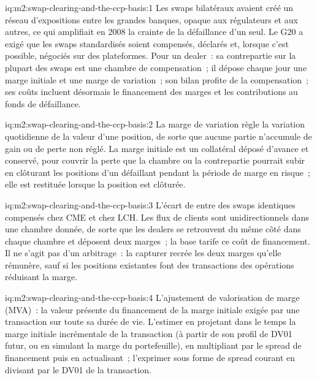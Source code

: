 \begin{solution}{iq:m2:swap-clearing-and-the-ccp-basis:1}
Les swaps bilatéraux avaient créé un réseau d'expositions entre les grandes banques, opaque aux
régulateurs et aux autres, ce qui amplifiait en 2008 la crainte de la défaillance d'un seul.
Le G20 a exigé que les swaps standardisés soient compensés, déclarés et, lorsque
c'est possible, négociés sur des plateformes. Pour un dealer~: sa contrepartie sur la plupart des swaps
est une chambre de compensation~; il dépose chaque jour une marge initiale et une marge de variation~; son
bilan profite de la compensation~; ses coûts incluent désormais le financement des marges et
les contributions au fonds de défaillance.
\end{solution}

\begin{solution}{iq:m2:swap-clearing-and-the-ccp-basis:2}
La marge de variation règle la variation quotidienne de la valeur d'une position, de sorte que
aucune partie n'accumule de gain ou de perte non réglé. La marge initiale est un collatéral
déposé d'avance et conservé, pour couvrir la perte que la chambre ou la contrepartie pourrait
subir en clôturant les positions d'un défaillant pendant la période de marge en
risque~; elle est restituée lorsque la position est clôturée.
\end{solution}

\begin{solution}{iq:m2:swap-clearing-and-the-ccp-basis:3}
L'écart de  entre des swaps identiques compensés chez CME et chez LCH.
Les flux de clients sont unidirectionnels dans une chambre donnée, de sorte que les dealers se retrouvent du même côté
dans chaque chambre et déposent deux marges~; la base tarife ce coût de financement. Il ne s'agit pas
d'un arbitrage~: la capturer recrée les deux marges qu'elle rémunère, sauf si les positions existantes
font des transactions des opérations réduisant la marge.
\end{solution}

\begin{solution}{iq:m2:swap-clearing-and-the-ccp-basis:4}
L'ajustement de valorisation de marge (MVA)~: la valeur présente du financement de la marge initiale exigée par
une transaction sur toute sa durée de vie. L'estimer en projetant dans le temps la marge initiale incrémentale
de la transaction (à partir de son profil de DV01 futur, ou en simulant la marge du portefeuille), en multipliant
par le spread de financement puis en actualisant~; l'exprimer sous forme de spread courant en divisant par le DV01
de la transaction.
\end{solution}


